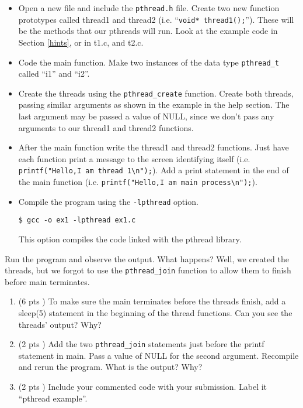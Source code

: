 \documentclass[letterpaper,10pt]{article}
\newcommand{\cmd}[1]{\texttt{#1}}
\begin{document}
\begin{itemize}
 \item Open a new file and include the \cmd{pthread.h} file.
 Create two new function prototypes called thread1 and thread2 (i.e.
 ``\verb+void* thread1();+''). These will be the methods that our
 pthreads will run. Look at the example code
 in Section \ref{hints}, or in t1.c, and t2.c.

 \item Code the main function. Make two instances of the data
 type \verb=pthread_t= called ``i1'' and ``i2''.

 \item Create the threads using the \verb=pthread_create= function. Create both threads,
 passing similar arguments as shown in the example in the help section. The
 last argument may be passed a value of NULL, since we don’t pass any
 arguments to our thread1 and thread2 functions.

 \item After the main function write the thread1 and thread2 functions.
 Just have each function print a message to the screen identifying itself
 (i.e. \verb+printf("Hello,I am thread 1\n");+). Add a print statement in the end
 of the main function (i.e. \verb+printf("Hello,I am main process\n");+).

 \item Compile the program using the \cmd{-lpthread} option.
\begin{verbatim}
$ gcc -o ex1 -lpthread ex1.c
\end{verbatim}
This option compiles the code linked with the pthread library.

\end{itemize}

Run the program and observe the output. What happens? Well, we created the threads, but we forgot to
use the \verb+pthread_join+ function to allow them to finish before main terminates.

\begin{enumerate}
\item (6 pts ) To make sure the main terminates before the threads finish,
 add a sleep(5) statement in the beginning of the thread functions.
 Can you see the threads' output? Why?
\item (2 pts ) Add the two \verb=pthread_join= statements just before the printf statement in
 main. Pass a value of NULL for the second argument.
 Recompile and rerun the program. What is the output? Why?
\item (2 pts ) Include your commented code with your submission.
Label it ``pthread example''.
\end{enumerate}
\end{document}
